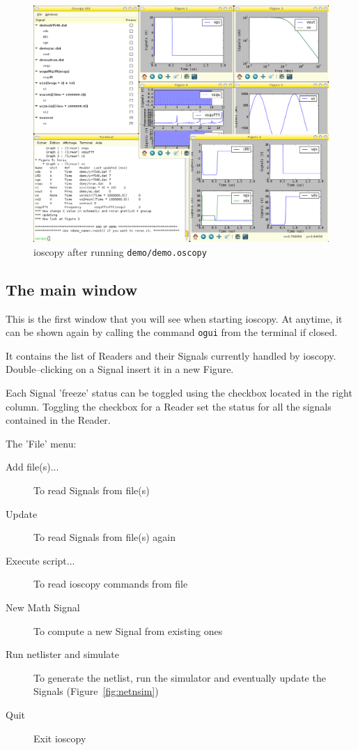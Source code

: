 \documentclass[a4paper,11pt]{article}
\begin{document}
\begin{figure}[htbp]
  \centering
  \includegraphics[width=.8\textwidth]{../png/ioscopy.png}
  \caption{ioscopy after running \texttt{demo/demo.oscopy}}
  \label{fig:screenshot}
\end{figure}

\subsection{The main window}
This is the first window that you will see when starting ioscopy.
At anytime, it can be shown again by calling the command \texttt{ogui} from the terminal if closed.

It contains the list of Readers and their Signals currently handled by ioscopy.
Double--clicking on a Signal insert it in a new Figure.

Each Signal 'freeze' status can be toggled using the checkbox located in the right column.
Toggling the checkbox for a Reader set the status for all the signals contained in the Reader.

The 'File' menu:
\begin{description}
\item[Add file(s)...] To read Signals from file(s)
\item[Update] To read Signals from file(s) again
\item[Execute script...] To read ioscopy commands from file
\item[New Math Signal] To compute a new Signal from existing ones
\item[Run netlister and simulate] To generate the netlist, run the simulator and eventually update the Signals (Figure~\ref{fig:netnsim})
\item[Quit] Exit ioscopy
\end{description}
\end{document}
